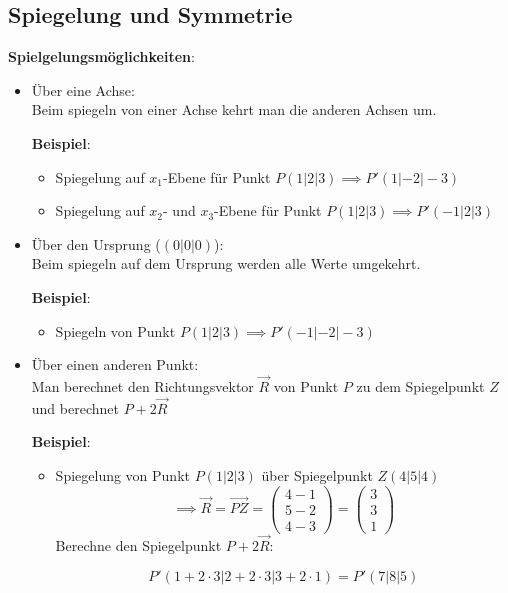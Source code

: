 \subsection{Spiegelung und Symmetrie}
\label{sec:symmetrie}
\textbf{Spielgelungsmöglichkeiten}:
    
\begin{itemize}
    \item Über eine Achse: \\
        Beim spiegeln von einer Achse kehrt man die anderen Achsen um.

        \textbf{Beispiel}: 
        \begin{itemize}
            \item Spiegelung auf $x_1$-Ebene für Punkt $P(1|2|3) \implies P'(1|-2|-3)$ 
            \item Spiegelung auf $x_2$- und $x_3$-Ebene für Punkt $P(1|2|3) \implies P'(-1|2|3)$
        \end{itemize}

    \item Über den Ursprung ($(0|0|0)$): \\
        Beim spiegeln auf dem Ursprung werden alle Werte umgekehrt.

        \textbf{Beispiel}:
        \begin{itemize}
            \item Spiegeln von Punkt $P(1|2|3) \implies P'(-1|-2|-3)$
        \end{itemize}

    \item Über einen anderen Punkt: \\
        Man berechnet den Richtungsvektor $\vec{R}$ von Punkt $P$ zu dem Spiegelpunkt $Z$ und berechnet $P+2\vec{R}$

    \textbf{Beispiel}:
    \begin{itemize}
        \item Spiegelung von Punkt $P(1|2|3)$ über Spiegelpunkt $Z(4|5|4)$ 
        \[
            \implies \vec{R} = \overrightarrow{PZ} = 
            \begin{pmatrix}
                4 - 1 \\ 5 - 2 \\ 4 - 3
            \end{pmatrix}
            =
            \begin{pmatrix}
                3 \\ 3 \\ 1
            \end{pmatrix}
        \]
        Berechne den Spiegelpunkt $P+2\vec{R}$:

        \[P'(1 + 2\cdot 3|2 + 2\cdot 3| 3 + 2\cdot 1) = P'(7|8|5)\]

    \end{itemize}
\end{itemize}
